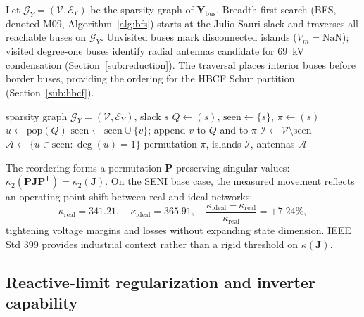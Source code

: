 Let $\mathcal{G}_Y=(\mathcal{V},\mathcal{E}_Y)$ be the sparsity graph of $\mathbf{Y}_{\mathrm{bus}}$. Breadth-first search (BFS, denoted M09, Algorithm~\ref{alg:bfs}) starts at the Julio Sauri slack and traverses all reachable buses on $\mathcal{G}_Y$. Unvisited buses mark disconnected islands ($V_m=\mathrm{NaN}$); visited degree-one buses identify radial antennas candidate for 69~kV condensation (Section~\ref{sub:reduction}). The traversal places interior buses before border buses, providing the ordering for the HBCF Schur partition (Section~\ref{sub:hbcf}).

\begin{algorithm}[!t]
\caption{Breadth-first scaling on the admittance graph (M09)}
\label{alg:bfs}
\begin{algorithmic}[1]
\Require sparsity graph $\mathcal{G}_Y=(\mathcal{V},\mathcal{E}_Y)$, slack $s$
\State $Q \gets (s)$, $\mathrm{seen}\gets\{s\}$, $\pi\gets(s)$
  \State $u \gets \mathrm{pop}(Q)$
      \State $\mathrm{seen}\gets\mathrm{seen}\cup\{v\}$; append $v$ to $Q$ and to $\pi$
    \EndIf
  \EndFor
\EndWhile
\State $\mathcal{I}\gets\mathcal{V}\setminus\mathrm{seen}$ 
\State $\mathcal{A}\gets\{u\in\mathrm{seen}:\deg(u)=1\}$ 
\State \Return permutation $\pi$, islands $\mathcal{I}$, antennas $\mathcal{A}$
\end{algorithmic}
\end{algorithm}

The reordering forms a permutation $\mathbf{P}$ preserving singular values: $\kappa_2(\mathbf{P}\mathbf{J}\mathbf{P}^{\mathsf{T}})=\kappa_2(\mathbf{J})$. On the SENI base case, the measured movement reflects an operating-point shift between real and ideal networks:
\begin{equation}
\kappa_{\mathrm{real}} = 341.21, \quad
\kappa_{\mathrm{ideal}} = 365.91, \quad
\frac{\kappa_{\mathrm{ideal}}-\kappa_{\mathrm{real}}}{\kappa_{\mathrm{real}}} = +7.24\%,
\label{eq:bfs}
\end{equation}
tightening voltage margins and losses without expanding state dimension. IEEE Std 399 \cite{ieee399} provides industrial context rather than a rigid threshold on $\kappa(\mathbf{J})$.

\subsection{Reactive-limit regularization and inverter capability}
\label{sub:regularization}

